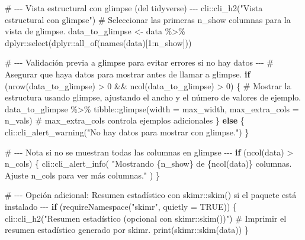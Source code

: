 \documentclass[
  letterpaper,
  DIV=11,
  numbers=noendperiod]{scrartcl}
\newenvironment{Shaded}{\begin{snugshade}}{\end{snugshade}}
\newcommand{\AttributeTok}[1]{\textcolor[rgb]{0.40,0.45,0.13}{#1}}
\newcommand{\CommentTok}[1]{\textcolor[rgb]{0.37,0.37,0.37}{#1}}
\newcommand{\ConstantTok}[1]{\textcolor[rgb]{0.56,0.35,0.01}{#1}}
\newcommand{\ControlFlowTok}[1]{\textcolor[rgb]{0.00,0.23,0.31}{\textbf{#1}}}
\newcommand{\DecValTok}[1]{\textcolor[rgb]{0.68,0.00,0.00}{#1}}
\newcommand{\FunctionTok}[1]{\textcolor[rgb]{0.28,0.35,0.67}{#1}}
\newcommand{\NormalTok}[1]{\textcolor[rgb]{0.00,0.23,0.31}{#1}}
\newcommand{\OtherTok}[1]{\textcolor[rgb]{0.00,0.23,0.31}{#1}}
\newcommand{\SpecialCharTok}[1]{\textcolor[rgb]{0.37,0.37,0.37}{#1}}
\newcommand{\StringTok}[1]{\textcolor[rgb]{0.13,0.47,0.30}{#1}}
\begin{document}
\begin{Shaded}
\begin{Highlighting}[]
  \CommentTok{\# {-}{-}{-} Vista estructural con glimpse (del tidyverse) {-}{-}{-}}
\NormalTok{  cli}\SpecialCharTok{::}\FunctionTok{cli\_h2}\NormalTok{(}\StringTok{"Vista estructural con glimpse"}\NormalTok{)}
  \CommentTok{\# Seleccionar las primeras \textquotesingle{}n\_show\textquotesingle{} columnas para la vista de glimpse.}
\NormalTok{  data\_to\_glimpse }\OtherTok{\textless{}{-}}\NormalTok{ data }\SpecialCharTok{\%\textgreater{}\%}
\NormalTok{    dplyr}\SpecialCharTok{::}\FunctionTok{select}\NormalTok{(dplyr}\SpecialCharTok{::}\FunctionTok{all\_of}\NormalTok{(}\FunctionTok{names}\NormalTok{(data)[}\DecValTok{1}\SpecialCharTok{:}\NormalTok{n\_show]))}
  
  \CommentTok{\# {-}{-}{-} Validación previa a \textasciigrave{}glimpse\textasciigrave{} para evitar errores si no hay datos {-}{-}{-}}
  \CommentTok{\# Asegurar que haya datos para mostrar antes de llamar a glimpse.}
  \ControlFlowTok{if}\NormalTok{ (}\FunctionTok{nrow}\NormalTok{(data\_to\_glimpse) }\SpecialCharTok{\textgreater{}} \DecValTok{0} \SpecialCharTok{\&\&} \FunctionTok{ncol}\NormalTok{(data\_to\_glimpse) }\SpecialCharTok{\textgreater{}} \DecValTok{0}\NormalTok{) \{}
    \CommentTok{\# Mostrar la estructura usando glimpse, ajustando el ancho y el número de valores de ejemplo.}
\NormalTok{    data\_to\_glimpse }\SpecialCharTok{\%\textgreater{}\%}
\NormalTok{      tibble}\SpecialCharTok{::}\FunctionTok{glimpse}\NormalTok{(}\AttributeTok{width =}\NormalTok{ max\_width, }\AttributeTok{max\_extra\_cols =}\NormalTok{ n\_vals) }\CommentTok{\# max\_extra\_cols controla ejemplos adicionales}
\NormalTok{  \} }\ControlFlowTok{else}\NormalTok{ \{}
\NormalTok{    cli}\SpecialCharTok{::}\FunctionTok{cli\_alert\_warning}\NormalTok{(}\StringTok{"No hay datos para mostrar con \textasciigrave{}glimpse\textasciigrave{}."}\NormalTok{)}
\NormalTok{  \}}
  
  \CommentTok{\# {-}{-}{-} Nota si no se muestran todas las columnas en glimpse {-}{-}{-}}
  \ControlFlowTok{if}\NormalTok{ (}\FunctionTok{ncol}\NormalTok{(data) }\SpecialCharTok{\textgreater{}}\NormalTok{ n\_cols) \{}
\NormalTok{    cli}\SpecialCharTok{::}\FunctionTok{cli\_alert\_info}\NormalTok{(}
      \StringTok{"Mostrando \{n\_show\} de \{ncol(data)\} columnas. Ajuste \textquotesingle{}n\_cols\textquotesingle{} para ver más columnas."}
\NormalTok{    )}
\NormalTok{  \}}
  
  \CommentTok{\# {-}{-}{-} Opción adicional: Resumen estadístico con skimr::skim() si el paquete está instalado {-}{-}{-}}
  \ControlFlowTok{if}\NormalTok{ (}\FunctionTok{requireNamespace}\NormalTok{(}\StringTok{"skimr"}\NormalTok{, }\AttributeTok{quietly =} \ConstantTok{TRUE}\NormalTok{)) \{}
\NormalTok{    cli}\SpecialCharTok{::}\FunctionTok{cli\_h2}\NormalTok{(}\StringTok{"Resumen estadístico (opcional con skimr::skim())"}\NormalTok{)}
    \CommentTok{\# Imprimir el resumen estadístico generado por skimr.}
    \FunctionTok{print}\NormalTok{(skimr}\SpecialCharTok{::}\FunctionTok{skim}\NormalTok{(data))}
\NormalTok{  \}}
  

\end{Highlighting}
\end{Shaded}
\end{document}
